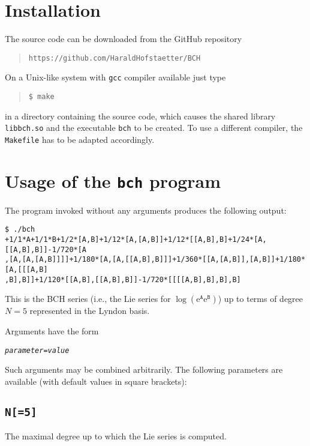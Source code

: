 \documentclass[11pt,a4paper]{article}
\newcommand{\ee}{\mathrm{e}}
\renewcommand{\AA}{\mathtt{A}}
\newcommand{\BB}{\mathtt{B}}
\begin{document}
\section{Installation}
The source code  can be downloaded from the GitHub repository
\begin{quote}
{\tt https://github.com/HaraldHofstaetter/BCH}
\end{quote}
On a Unix-like system with \verb|gcc| compiler available just type
\begin{quote}
\begin{BVerbatim}
$ make
\end{BVerbatim} 
\end{quote}
in a directory containing the source code, which causes 
the shared library \verb|libbch.so| and the executable \verb|bch|
to be created.
To use a different compiler, the \verb|Makefile| has to be adapted accordingly.


\section{Usage of the {\tt bch} program}\label{Sec:usage_bch}
The program invoked without any arguments produces the following output:

\medskip

{\small\begin{BVerbatim}
$ ./bch
+1/1*A+1/1*B+1/2*[A,B]+1/12*[A,[A,B]]+1/12*[[A,B],B]+1/24*[A,[[A,B],B]]-1/720*[A
,[A,[A,[A,B]]]]+1/180*[A,[A,[[A,B],B]]]+1/360*[[A,[A,B]],[A,B]]+1/180*[A,[[[A,B]
,B],B]]+1/120*[[A,B],[[A,B],B]]-1/720*[[[[A,B],B],B],B]
\end{BVerbatim}
}

\medskip

\noindent This is the BCH series (i.e., the Lie series for $\log(\ee^{\AA}\ee^{\BB})$)
up to terms of degree $N=5$ represented in the Lyndon basis.

Arguments have the form
\begin{center}
{\tt\em parameter=value}
\end{center}
Such arguments may be combined arbitrarily. The following parameters are available 
(with default values in square brackets):

\subsection*{{\tt N[=5]}}
The maximal degree up to which the Lie series is computed.
\end{document}
